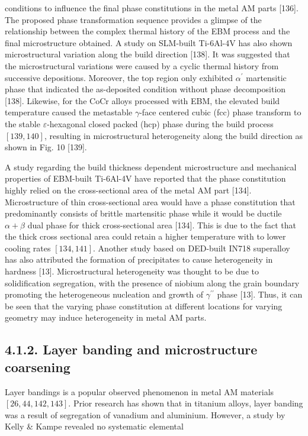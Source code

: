 \documentclass[10pt]{article}
\begin{document}
conditions to influence the final phase constitutions in the metal AM parts [136]. The proposed phase transformation sequence provides a glimpse of the relationship between the complex thermal history of the EBM process and the final microstructure obtained. A study on SLM-built Ti-6Al-4V has also shown microstructural variation along the build direction [138]. It was suggested that the microstructural variations were caused by a cyclic thermal history from successive depositions. Moreover, the top region only exhibited $\alpha^{\prime}$ martensitic phase that indicated the as-deposited condition without phase decomposition [138]. Likewise, for the CoCr alloys processed with EBM, the elevated build temperature caused the metastable $\gamma$-face centered cubic (fcc) phase transform to the stable $\varepsilon$-hexagonal closed packed (hcp) phase during the build process $[139,140]$, resulting in microstructural heterogeneity along the build direction as shown in Fig. 10 [139].

A study regarding the build thickness dependent microstructure and mechanical properties of EBM-built Ti-6Al-4V have reported that the phase constitution highly relied on the cross-sectional area of the metal AM part [134]. Microstructure of thin cross-sectional area would have a phase constitution that predominantly consists of brittle martensitic phase while it would be ductile $\alpha+\beta$ dual phase for thick cross-sectional area [134]. This is due to the fact that the thick cross sectional area could retain a higher temperature with to lower cooling rates $[134,141]$. Another study based on DED-built IN718 superalloy has also attributed the formation of precipitates to cause heterogeneity in hardness [13]. Microstructural heterogeneity was thought to be due to solidification segregation, with the presence of niobium along the grain boundary promoting the heterogeneous nucleation and growth of $\gamma^{\prime \prime}$ phase [13]. Thus, it can be seen that the varying phase constitution at different locations for varying geometry may induce heterogeneity in metal AM parts.

\subsection*{4.1.2. Layer banding and microstructure coarsening}
Layer bandings is a popular observed phenomenon in metal AM materials $[26,44,142,143]$. Prior research has shown that in titanium alloys, layer banding was a result of segregation of vanadium and aluminium. However, a study by Kelly \& Kampe revealed no systematic elemental
\end{document}
